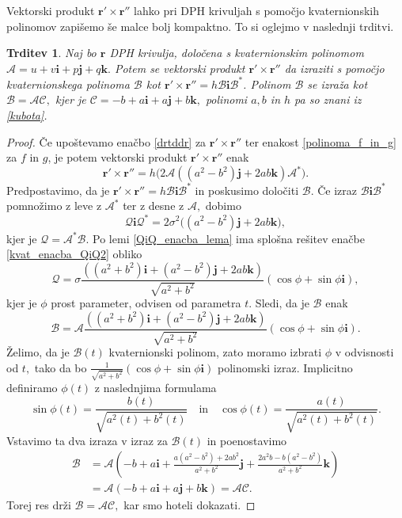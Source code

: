 \documentclass[12pt,a4paper,twoside]{article}
\theoremstyle{definition} %
\theoremstyle{plain} %
\newtheorem{trditev}[definicija]{Trditev}
\theoremstyle{primerstyle}
\numberwithin{equation}{section}  %
\newcommand{\rV}{\mathbf{r}}
\newcommand{\iV}{\mathbf{i}}
\newcommand{\jV}{\mathbf{j}}
\newcommand{\kV}{\mathbf{k}}
\newcommand{\AQ}{\mathcal{A}}
\newcommand{\BQ}{\mathcal{B}}
\newcommand{\CQ}{\mathcal{C}}
\newcommand{\QQ}{\mathcal{Q}}
\begin{document}
Vektorski produkt $\rV'\times\rV''$ lahko pri DPH krivuljah s pomočjo kvaternionskih polinomov zapišemo še malce bolj kompaktno. To si oglejmo v naslednji trditvi.
\begin{trditev}
	\label{drtddr_za_DPH}
	Naj bo $\rV$ DPH krivulja, določena s kvaternionskim polinomom $\AQ=u+v\iV+p\jV+q\kV.$ Potem se vektorski produkt $\rV'\times\rV''$ da izraziti s pomočjo kvaternionskega polinoma $\BQ$ kot $\rV'\times\rV''=h\BQ\iV\BQ^*$. Polinom $\BQ$ se izraža kot $\BQ=\AQ\CQ,$ kjer je $\CQ=-b+a\iV+a\jV+b\kV,$ polinomi $a,b$ in $h$ pa so znani iz \eqref{kubota}.
\end{trditev}
\begin{proof}
	Če upoštevamo enačbo \eqref{drtddr} za $\rV'\times\rV''$ ter enakost \eqref{polinoma_f_in_g} za $f$ in $g$, je potem vektorski produkt $\rV'\times\rV''$ enak
	\begin{equation}
		\rV'\times\rV''=h\big(2\AQ((a^2-b^2)\jV+2ab\kV)\AQ^*\big).
	\end{equation}
	Predpostavimo, da je $\rV'\times\rV''=h\BQ\iV\BQ^*$ in poskusimo določiti $\BQ.$ Če izraz $\BQ\iV\BQ^*$ pomnožimo z leve z $\AQ^*$ ter z desne z $\AQ,$ dobimo
	\begin{equation}
		\label{kvat_enacba_QiQ2}
		\QQ\iV\QQ^*=2\sigma^2\big((a^2-b^2)\jV+2ab\kV\big),
	\end{equation}
	kjer je $\QQ=\AQ^*\BQ.$ Po lemi \ref{QiQ_enacba_lema} ima splošna rešitev enačbe \eqref{kvat_enacba_QiQ2} obliko
	\begin{equation*}
		\QQ=\sigma\frac{((a^2+b^2)\iV+(a^2-b^2)\jV+2ab\kV)}{\sqrt{a^2+b^2}}(\cos\phi+\sin\phi\iV),
	\end{equation*}
	kjer je $\phi$ prost parameter, odvisen od parametra $t.$ Sledi, da je $\BQ$ enak
	\begin{equation*}
		\BQ=\AQ\frac{((a^2+b^2)\iV+(a^2-b^2)\jV+2ab\kV)}{\sqrt{a^2+b^2}}(\cos\phi+\sin\phi\iV).
	\end{equation*}
	Želimo, da je $\BQ(t)$ kvaternionski polinom, zato moramo izbrati  $\phi$ v odvisnosti od $t,$ tako da bo $\frac{1}{\sqrt{a^2+b^2}}(\cos\phi+\sin\phi\iV)$ polinomski izraz. Implicitno definiramo $\phi(t)$ z naslednjima formulama
	\begin{equation*}
		\sin\phi(t)=\frac{b(t)}{\sqrt{a^2(t)+b^2(t)}}\quad\text{in}\quad\cos\phi(t)=\frac{a(t)}{\sqrt{a^2(t)+b^2(t)}}.
	\end{equation*}
	Vstavimo ta dva izraza v izraz za $\BQ(t)$ in poenostavimo
	\begin{align*}
		\BQ&=\AQ\left(-b+a\iV+\frac{a(a^2-b^2)+2ab^2}{a^2+b^2}\jV+\frac{2a^2b-b(a^2-b^2)}{a^2+b^2}\kV\right)\\
		&=\AQ(-b+a\iV+a\jV+b\kV)=\AQ\CQ.
	\end{align*}
	Torej res drži $\BQ=\AQ\CQ,$ kar smo hoteli dokazati.
\end{proof}
\end{document}
